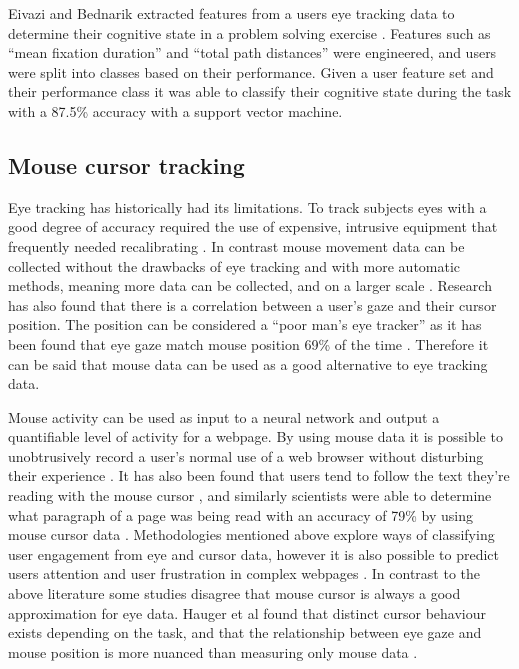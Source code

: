 \documentclass{article}
\begin{document}
Eivazi and Bednarik extracted features from a users eye tracking data to determine their cognitive state in a problem solving exercise \cite{eivazi2011predicting}.
Features such as ``mean fixation duration'' and ``total path distances'' were engineered, and users were split into classes based on their performance. 
Given a user feature set and their performance class it was able to classify their cognitive state during the task with a 87.5\% accuracy with a support vector machine.

\subsection{Mouse cursor tracking}
Eye tracking has historically had its limitations. 
To track subjects eyes with a good degree of accuracy required the use of expensive, intrusive equipment that frequently needed recalibrating \cite{richardson2004eye}. 
In contrast mouse movement data can be collected without the drawbacks of eye tracking and with more automatic methods, meaning more data can be collected, and on a larger scale \cite{demvsar2017quantifying}.
Research has also found that there is a correlation between a user’s gaze and their cursor position. 
The position can be considered a ``poor man’s eye tracker'' as it has been found that eye gaze match mouse position 69\% of the time \cite{cooke2006mouse}. 
Therefore it can be said that mouse data can be used as a good alternative to eye tracking data.

Mouse activity can be used as input to a neural network and output a quantifiable level of activity for a webpage. 
By using mouse data it is possible to unobtrusively record a user’s normal use of a web browser without disturbing their experience \cite{goecks2000learning}.
It has also been found that users tend to follow the text they’re reading with the mouse cursor \cite{liu2007detecting}, and similarly scientists were able to determine what paragraph of a page was being read with an accuracy of 79\% by using mouse cursor data \cite{hauger2011using}. 
Methodologies mentioned above explore ways of classifying user engagement from eye and cursor data, however it is also possible to predict users attention and user frustration in complex webpages \cite{navalpakkam2012mouse}.
In contrast to the above literature some studies disagree that mouse cursor is always a good approximation for eye data. 
Hauger et al found that distinct cursor behaviour exists depending on the task, and that the relationship between eye gaze and mouse position is more nuanced than measuring only mouse data \cite{huang2012user}.
\end{document}
